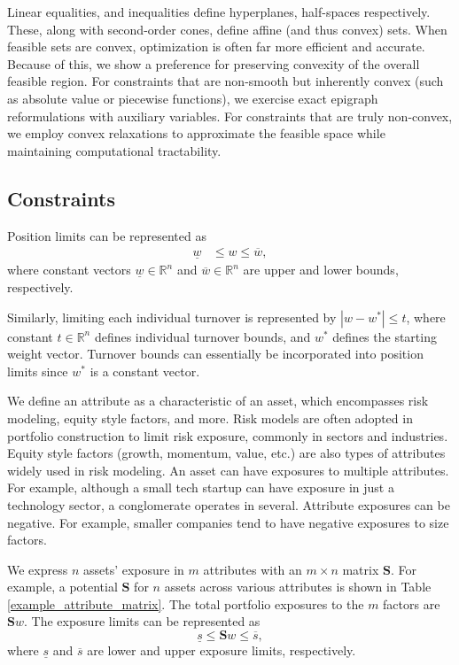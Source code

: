 \documentclass[11pt, letterpaper]{article}
\begin{document}
Linear equalities, and inequalities define hyperplanes, half-spaces respectively. These, along with second-order cones, define
affine (and thus convex) sets. When feasible sets are convex, optimization is often far more efficient and accurate. Because of
this, we show a preference for preserving convexity of the overall feasible region. For constraints that are non-smooth but
inherently convex (such as absolute value or piecewise functions), we exercise exact epigraph reformulations with auxiliary
variables. For constraints that are truly non-convex, we employ convex relaxations to approximate the feasible space while
maintaining computational tractability.

\subsection{Constraints}
Position limits can be represented as
\begin{align*}
    \underline{w} & \leq w \leq \overline{w},
\end{align*}
where constant vectors $\underline{w} \in \mathds{R}^n$ and $\overline{w} \in \mathds{R}^n$ are upper and lower bounds, respectively.

Similarly, limiting each individual turnover is represented by $|w - w^*| \leq t$,
where constant $t \in \mathds{R}^n$ defines individual turnover bounds, and $w^*$ defines the starting weight vector. Turnover bounds can essentially be incorporated into position limits since $w^*$ is a constant vector.

We define an attribute as a characteristic of an asset, which encompasses risk modeling, equity style factors, and more. Risk
models are often adopted in portfolio construction to limit risk exposure, commonly in sectors and industries. Equity style
factors (growth, momentum, value, etc.) are also types of attributes widely used in risk modeling. An asset can have exposures
to multiple attributes. For example, although a small tech startup can have exposure in just a technology sector, a conglomerate
operates in several. Attribute exposures can be negative. For example, smaller companies tend to have negative exposures to size
factors.

We express $n$ assets' exposure in $m$ attributes with an $m\times n$ matrix $\mathbf{S}$. For example, a potential $\mathbf{S}$
for $n$ assets across various attributes is shown in Table \ref{example_attribute_matrix}.  The total portfolio exposures to the
$m$ factors are $\mathbf{S}w$. The exposure limits can be represented as
\begin{equation}
    \underline{s} \leq \mathbf{S}w \leq \overline{s},
\end{equation}
where $\underline{s}$ and $\overline{s}$ are lower and upper exposure limits, respectively.
\end{document}
